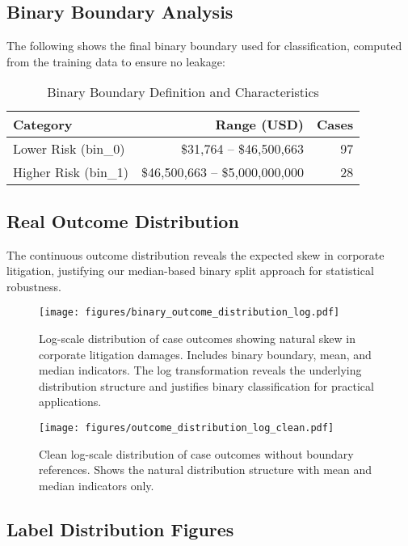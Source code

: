 \documentclass[11pt,a4paper]{article}
\begin{document}
\subsection{Binary Boundary Analysis}

The following shows the final binary boundary used for classification, computed from the training data to ensure no leakage:

\begin{table}[H]
\centering
\caption{Binary Boundary Definition and Characteristics}
\begin{tabular}{lrr}
\toprule
\textbf{Category} & \textbf{Range (USD)} & \textbf{Cases} \\
\midrule
Lower Risk (bin\_0) & \$31,764 -- \$46,500,663 & 97 \\
Higher Risk (bin\_1) & \$46,500,663 -- \$5,000,000,000 & 28 \\
\bottomrule
\end{tabular}
\end{table}

\subsection{Real Outcome Distribution}

The continuous outcome distribution reveals the expected skew in corporate litigation, justifying our median-based binary split approach for statistical robustness.

\begin{figure}[H]
\centering
\texttt{[image: figures/binary\_outcome\_distribution\_log.pdf]}
\caption{Log-scale distribution of case outcomes showing natural skew in corporate litigation damages. Includes binary boundary, mean, and median indicators. The log transformation reveals the underlying distribution structure and justifies binary classification for practical applications.}
\end{figure}

\begin{figure}[H]
\centering
\texttt{[image: figures/outcome\_distribution\_log\_clean.pdf]}
\caption{Clean log-scale distribution of case outcomes without boundary references. Shows the natural distribution structure with mean and median indicators only.}
\end{figure}

\subsection{Label Distribution Figures}
\end{document}
